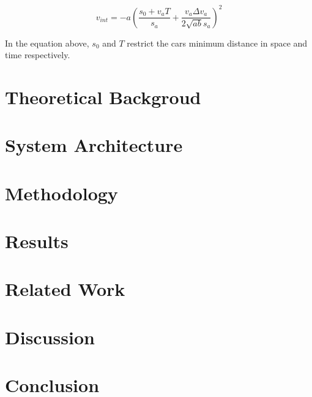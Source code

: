 \documentclass[10pt]{article}
\begin{document}
\begin{equation}
	v_{int} = - a ( \frac{s_0 + v_a T}{s_a} + \frac{v_a \Delta v_a}{2 \sqrt{ab} s_a} )^2
\end{equation}

In the equation above, $s_0$ and $T$ restrict the cars minimum distance in space and time respectively.

\section{Theoretical Backgroud}
	
\section{System Architecture}
	
\section{Methodology}

\section{Results}

\section{Related Work}

\section{Discussion}
	
\section{Conclusion}

{\tiny\printbibliography}
\end{document}
